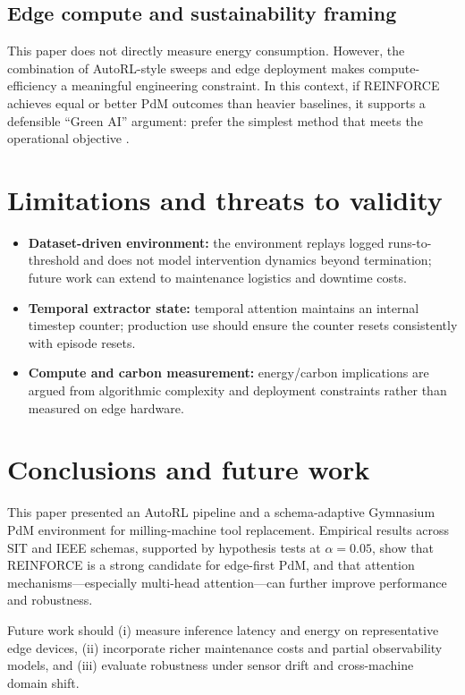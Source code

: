 \documentclass[11pt]{article}
\begin{document}
\subsection{Edge compute and sustainability framing}
This paper does not directly measure energy consumption. However, the combination of AutoRL-style sweeps and edge deployment makes compute-efficiency a meaningful engineering constraint. In this context, if REINFORCE achieves equal or better PdM outcomes than heavier baselines, it supports a defensible ``Green AI'' argument: prefer the simplest method that meets the operational objective \parencite{Schwartz2020GreenAI, Strubell2019Energy}.

\section{Limitations and threats to validity}
\label{sec:limits}
\begin{itemize}
	\item \textbf{Dataset-driven environment:} the environment replays logged runs-to-threshold and does not model intervention dynamics beyond termination; future work can extend to maintenance logistics and downtime costs.
	\item \textbf{Temporal extractor state:} temporal attention maintains an internal timestep counter; production use should ensure the counter resets consistently with episode resets.
	\item \textbf{Compute and carbon measurement:} energy/carbon implications are argued from algorithmic complexity and deployment constraints rather than measured on edge hardware.
\end{itemize}

\section{Conclusions and future work}
\label{sec:conclusion}
This paper presented an AutoRL pipeline and a schema-adaptive Gymnasium PdM environment for milling-machine tool replacement. Empirical results across SIT and IEEE schemas, supported by hypothesis tests at $\alpha=0.05$, show that REINFORCE is a strong candidate for edge-first PdM, and that attention mechanisms---especially multi-head attention---can further improve performance and robustness.

Future work should (i) measure inference latency and energy on representative edge devices, (ii) incorporate richer maintenance costs and partial observability models, and (iii) evaluate robustness under sensor drift and cross-machine domain shift.
\end{document}
